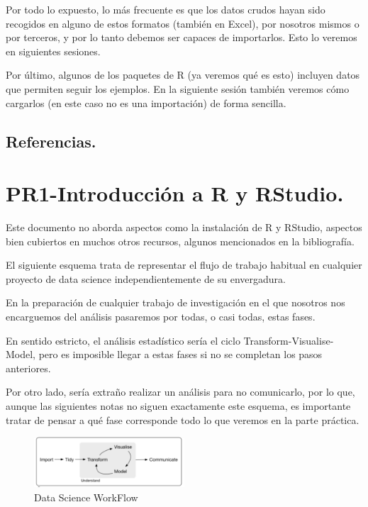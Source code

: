 \documentclass[
  letterpaper,
  DIV=11,
  numbers=noendperiod]{scrreprt}
\begin{document}
Por todo lo expuesto, lo más frecuente es que los datos crudos hayan
sido recogidos en alguno de estos formatos (también en Excel), por
nosotros mismos o por terceros, y por lo tanto debemos ser capaces de
importarlos. Esto lo veremos en siguientes sesiones.

Por último, algunos de los paquetes de R (ya veremos qué es esto)
incluyen datos que permiten seguir los ejemplos. En la siguiente sesión
también veremos cómo cargarlos (en este caso no es una importación) de
forma sencilla.

\hypertarget{referencias.}{%
\section{Referencias.}\label{referencias.}}


\hypertarget{pr1-introducciuxf3n-a-r-y-rstudio.}{%
\chapter{PR1-Introducción a R y
RStudio.}\label{pr1-introducciuxf3n-a-r-y-rstudio.}}

Este documento no aborda aspectos como la instalación de R y RStudio,
aspectos bien cubiertos en muchos otros recursos, algunos mencionados en
la bibliografía.

El siguiente esquema trata de representar el flujo de trabajo habitual
en cualquier proyecto de data science independientemente de su
envergadura.

En la preparación de cualquier trabajo de investigación en el que
nosotros nos encarguemos del análisis pasaremos por todas, o casi todas,
estas fases.

En sentido estricto, el análisis estadístico sería el ciclo
Transform-Visualise-Model, pero es imposible llegar a estas fases si no
se completan los pasos anteriores.

Por otro lado, sería extraño realizar un análisis para no comunicarlo,
por lo que, aunque las siguientes notas no siguen exactamente este
esquema, es importante tratar de pensar a qué fase corresponde todo lo
que veremos en la parte práctica.

\begin{figure}

{\centering \includegraphics[width=0.5\textwidth,height=\textheight]{./pics/datascience_proj.png}

}

\caption{Data Science WorkFlow}

\end{figure}
\end{document}
